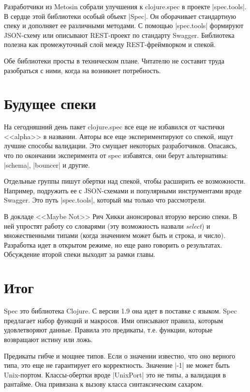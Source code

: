 Разработчики из Metosin собрали улучшения к clojure.spec в проекте
\spverb|spec.tools|. В сердце этой
библиотеки особый объект \spverb|Spec|. Он оборачивает стандартную спеку и дополняет ее
различными методами. С помощью \spverb|spec.tools| формируют JSON-схему или
описывают REST-проект по стандарту Swagger. Библиотека полезна как промежуточный
слой между REST-фреймворком и спекой.

Обе библиотеки просты в техническом плане. Читателю не составит труда
разобраться с ними, когда на возникнет потребность.

\section{Будущее спеки}

На сегодняшний день пакет clojure.spec все еще не избавился от частички
<<alpha>> в названии. Авторы все еще экспериментируют со спекой, ищут лучшие
способы валидации. Это смущает некоторых разработчиков. Опасаясь, что по
окончании эксперимента от spec избавятся, они берут альтернативы:
\spverb|schema|,
\spverb|bouncer| и другие.

Отдельные группы пишут обертки над спекой, чтобы расширить ее
возможности. Например, подружить ее с JSON-схемами и популярными инструментами
вроде Swagger. Это путь \spverb|spec.tools|, который мы только что рассмотрели.

В докладе <<Maybe Not>> Рич Хикки
анонсировал вторую версию спеки. В ней упростят работу со словарями (эту
возможность назвали \emph{select}) и множественными типами (когда значением
может быть и строка, и число). Разработка идет в открытом режиме, но еще рано
говорить о результатах. Обсуждение второй спеки выходит за рамки главы.

\section{Итог}

Spec это библиотека Clojure. С версии 1.9 она идет в поставке с языком. Spec
предлагает набор функций и макросов. Ими описывают правила, которым
удовлетворяют данные. Правила это предикаты, т.е. функции, которые возвращают
истину или ложь.

Предикаты гибче и мощнее типов. Если о значении известно, что оно верного типа,
это еще не гарантирует его корректность. Значение \spverb|-1| не может быть
Unix-портом. Классы-обертки вроде \spverb|UnixPort| это не типы, а валидация в
рантайме. Она привязана к вызову класса синтаксическим сахаром.

